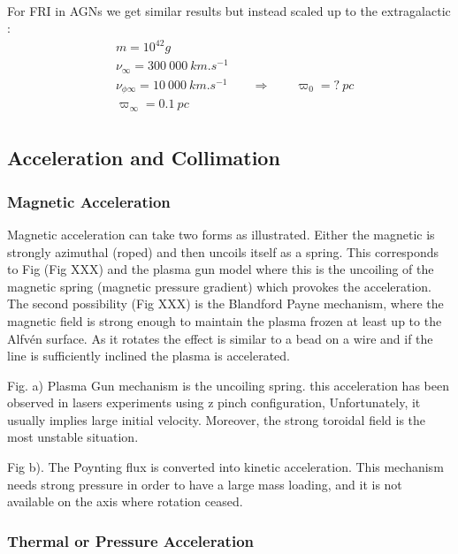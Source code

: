 \documentclass[10pt,a4paper,english]{article}
\begin{document}
\\
For FRI in AGNs we get similar results but instead scaled up to the extragalactic :
\begin{align*}
&   m = 10^{42}g \\
&   \nu_{\infty} = 300\:000\:km.s^{-1} \\
&   \nu_{\phi\infty} = 10\:000\:km.s^{-1} \;\;\;\;\;\;\; \Rightarrow \;\;\;\;\;\;\; \varpi_{0}= ?\:pc \\
&   \varpi_{\infty} = 0.1\:pc \\
\end{align*}

\subsection{Acceleration and Collimation}
\subsubsection{Magnetic Acceleration}

Magnetic acceleration can take two forms as illustrated. Either the magnetic is
strongly azimuthal (roped) and then uncoils itself as a spring. This
corresponds to Fig (Fig XXX) and the plasma gun model where this is the
uncoiling of the magnetic spring (magnetic pressure gradient) which provokes
the acceleration. The second possibility (Fig XXX) is the Blandford Payne
mechanism, where the magnetic field is strong enough to maintain the plasma
frozen at least up to the Alfvén surface. As it rotates the effect is similar
to a bead on a wire and if the line is sufficiently inclined the plasma is
accelerated.


Fig. a) Plasma Gun mechanism is the uncoiling spring. this acceleration has
been observed in lasers experiments using z pinch configuration, Unfortunately,
it usually implies large initial velocity. Moreover, the strong toroidal field
is the most unstable situation.

Fig b). The Poynting flux is converted into kinetic acceleration. This
mechanism needs strong pressure in order to have  a large mass loading, and it
is not available on the axis where rotation ceased.

\subsubsection{Thermal or Pressure Acceleration}
\end{document}

